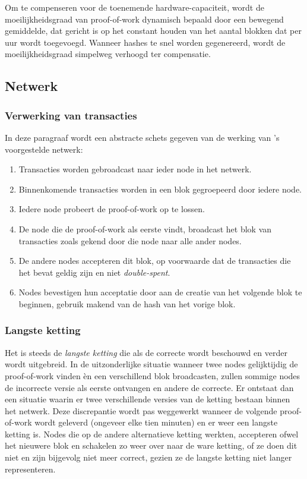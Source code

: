 	Om te compenseren voor de toenemende hardware-capaciteit, wordt de moeilijkheidsgraad van proof-of-work dynamisch bepaald door een bewegend gemiddelde, dat gericht is op het constant houden van het aantal blokken dat per uur wordt toegevoegd. Wanneer hashes te snel worden gegenereerd, wordt de moeilijkheidsgraad simpelweg verhoogd ter compensatie. ~\autocite{Nakamoto2008}
	\subsection{Netwerk}
		\subsubsection{Verwerking  van transacties}
		In deze paragraaf wordt een abstracte schets gegeven van de werking van \textcite{Nakamoto2008}’s voorgestelde netwerk:
		\begin{enumerate}
			\item Transacties worden gebroadcast naar ieder node in het netwerk.
			\item Binnenkomende transacties worden in een blok gegroepeerd door iedere node.
			\item Iedere node probeert de proof-of-work op te lossen.
			\item De node die de proof-of-work als eerste vindt, broadcast het blok van transacties zoals gekend door die node naar alle ander nodes.
			\item De andere nodes accepteren dit blok, op voorwaarde dat de transacties die het bevat geldig zijn en niet \textit{double-spent}.
			\item Nodes bevestigen hun acceptatie door aan de creatie van het volgende blok te beginnen, gebruik makend van de hash van het vorige blok.
		\end{enumerate}
		\subsubsection{Langste ketting}
		Het is steeds de \textit{langste ketting} die als de correcte wordt beschouwd en verder wordt uitgebreid. In de uitzonderlijke situatie wanneer twee nodes gelijktijdig de proof-of-work vinden èn een verschillend blok broadcasten, zullen sommige nodes de incorrecte versie als eerste ontvangen en andere de correcte. Er ontstaat dan een situatie waarin er twee verschillende versies van de ketting bestaan binnen het netwerk. Deze discrepantie wordt pas weggewerkt wanneer de volgende proof-of-work wordt geleverd  (ongeveer elke tien minuten) en er weer een langste ketting is. Nodes die op de andere alternatieve ketting werkten, accepteren ofwel het nieuwere blok en schakelen zo weer over naar de ware ketting, of ze doen dit niet en zijn bijgevolg niet meer correct, gezien ze de langste ketting niet langer representeren.
